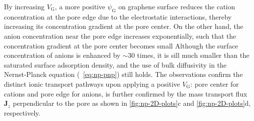 By increasing $V_{\mathrm{G}}$, a more positive $\psi_{\mathrm{G}}$ on
graphene surface reduces the cation concentration at the pore edge due
to the electrostatic interactions, thereby increasing its
concentration gradient at the pore center. On the other hand, the
anion concentration near the pore edge increases exponentially, such
that the concentration gradient at the pore center becomes small
%
Although the surface concentration of anions is enhanced by $\sim{}$30
times, it is sill much smaller than the saturated surface adsorption
density, and the use of bulk diffusivity in the Nernst-Planck equation
(~\autoref{eq:np-pnp}) still holds.
%
%
The observations confirm the distinct ionic transport pathways upon
applying a positive $V_{\mathrm{G}}$: pore center for cations and pore
edge for anions, is further confirmed by the mass transport flux
$\symbf{J}_{z}$ perpendicular to the pore as shown in
\autoref{fig:np-2D-plots}c and \autoref{fig:np-2D-plots}d, respectively.

